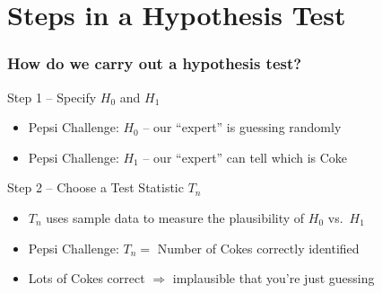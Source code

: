 \section{Steps in a Hypothesis Test}
\begin{frame}
  \frametitle{How do we carry out a hypothesis test?}

  \begin{block}{Step 1 -- Specify $H_0$ and $H_1$}
   \begin{itemize}
     \item Pepsi Challenge: $H_0$ -- our ``expert'' is guessing randomly \pause
     \item Pepsi Challenge: $H_1$ -- our ``expert'' can tell which is Coke
   \end{itemize}
  \end{block}

  \pause

  \begin{block}{Step 2 -- Choose a Test Statistic $T_n$}
    \begin{itemize}
      \item $T_n$ uses sample data to measure the plausibility of $H_0$ vs.\ $H_1$ \pause
      \item Pepsi Challenge: $T_n =$ Number of Cokes correctly identified \pause
      \item Lots of Cokes correct $\Rightarrow$ implausible that you're just guessing
    \end{itemize}
  \end{block}


\end{frame}

